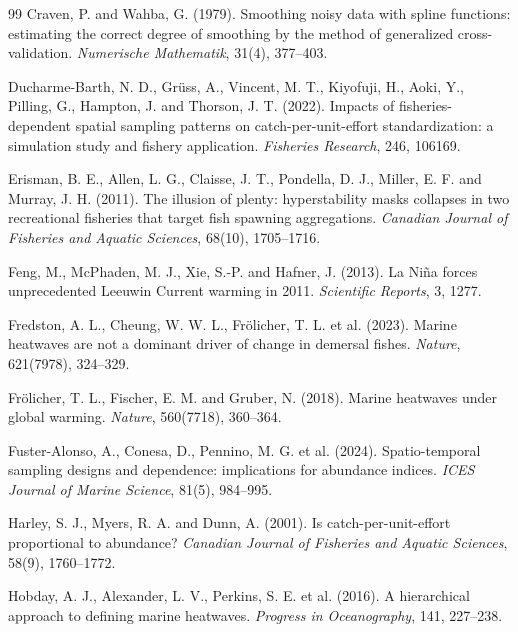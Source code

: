 \documentclass[11pt,a4paper]{article}
\begin{document}
\begin{thebibliography}{99}
Craven, P. and Wahba, G. (1979). Smoothing noisy data with spline functions: estimating the correct degree of smoothing by the method of generalized cross-validation. \textit{Numerische Mathematik}, 31(4), 377--403.

Ducharme-Barth, N. D., Gr\"uss, A., Vincent, M. T., Kiyofuji, H., Aoki, Y., Pilling, G., Hampton, J. and Thorson, J. T. (2022). Impacts of fisheries-dependent spatial sampling patterns on catch-per-unit-effort standardization: a simulation study and fishery application. \textit{Fisheries Research}, 246, 106169.

Erisman, B. E., Allen, L. G., Claisse, J. T., Pondella, D. J., Miller, E. F. and Murray, J. H. (2011). The illusion of plenty: hyperstability masks collapses in two recreational fisheries that target fish spawning aggregations. \textit{Canadian Journal of Fisheries and Aquatic Sciences}, 68(10), 1705--1716.

Feng, M., McPhaden, M. J., Xie, S.-P. and Hafner, J. (2013). La Ni\~{n}a forces unprecedented Leeuwin Current warming in 2011. \textit{Scientific Reports}, 3, 1277.

Fredston, A. L., Cheung, W. W. L., Fr\"olicher, T. L. et al. (2023). Marine heatwaves are not a dominant driver of change in demersal fishes. \textit{Nature}, 621(7978), 324--329.

Fr\"olicher, T. L., Fischer, E. M. and Gruber, N. (2018). Marine heatwaves under global warming. \textit{Nature}, 560(7718), 360--364.

Fuster-Alonso, A., Conesa, D., Pennino, M. G. et al. (2024). Spatio-temporal sampling designs and dependence: implications for abundance indices. \textit{ICES Journal of Marine Science}, 81(5), 984--995.

Harley, S. J., Myers, R. A. and Dunn, A. (2001). Is catch-per-unit-effort proportional to abundance? \textit{Canadian Journal of Fisheries and Aquatic Sciences}, 58(9), 1760--1772.

Hobday, A. J., Alexander, L. V., Perkins, S. E. et al. (2016). A hierarchical approach to defining marine heatwaves. \textit{Progress in Oceanography}, 141, 227--238.


\end{thebibliography}
\end{document}
